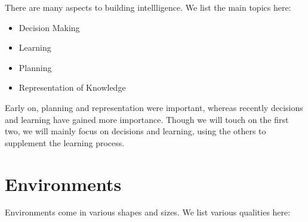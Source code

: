 \documentclass{report}
\begin{document}
There are many aspects to building intellligence. We list the main topics here:

\begin{itemize}
  \item Decision Making
  \item Learning
  \item Planning
  \item Representation of Knowledge
\end{itemize}

Early on, planning and representation were important, whereas recently decisions and learning have gained more importance. Though we will touch on the first two, we will mainly focus on decisions and learning, using the others to supplement the learning process.

\section{Environments}

Environments come in various shapes and sizes. We list various qualities here:
\end{document}
